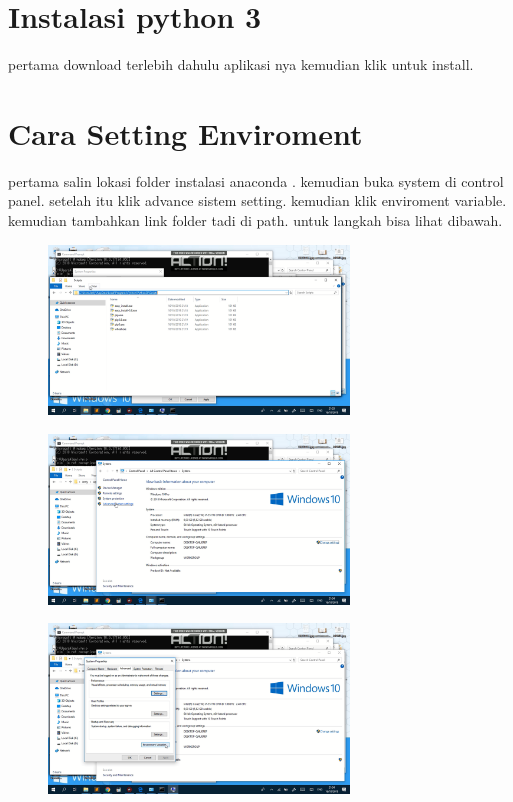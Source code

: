 \section{Instalasi python 3}
pertama download terlebih dahulu aplikasi nya kemudian klik untuk install.

\section{Cara Setting Enviroment}
pertama salin lokasi folder instalasi  anaconda . kemudian buka system di control panel. setelah itu klik advance sistem setting. kemudian klik enviroment variable. kemudian tambahkan link folder tadi di path. untuk langkah bisa lihat dibawah.
\begin{figure}[H]
	\centering
	\includegraphics[width=8cm]{figures/3-1.png}
		
\end{figure}
\begin{figure}[H]
	\centering
	\includegraphics[width=8cm]{figures/3-2.png}
	
\end{figure}
\begin{figure}[H]
	\centering
	\includegraphics[width=8cm]{figures/3-3.png}
	
\end{figure}
